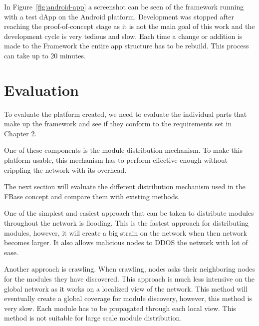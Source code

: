 In Figure~\ref{fig:android-app} a screenshot can be seen of the framework running with a test dApp on the Android platform. Development was stopped after reaching the proof-of-concept stage as it is not the main goal of this work and the development cycle is very tedious and slow. Each time a change or addition is made to the Framework the entire app structure has to be rebuild. This process can take up to 20 minutes. 


\section{Evaluation}

To evaluate the platform created, we need to evaluate the individual parts that make up the framework and see if they conform to the requirements set in Chapter 2.

One of these components is the module distribution mechanism. To make this platform usable, this mechanism has to perform effective enough without crippling the network with its overhead.

The next section will evaluate the different distribution mechanism used in the FBase concept and compare them with existing methods.

One of the simplest and easiest approach that can be taken to distribute modules throughout the network is flooding. This is the fastest approach for distributing modules, however, it will create a big strain on the network when then network becomes larger. It also allows malicious nodes to DDOS the network with  lot of ease.

Another approach is crawling. When crawling, nodes asks their neighboring nodes for the modules they have discovered. This approach is much less intensive on the global network as it works on a localized view of the network. This method will eventually create a global coverage for module discovery, however, this method is very slow. Each module has to be propagated through each local view. This method is not suitable for large scale module distribution.

